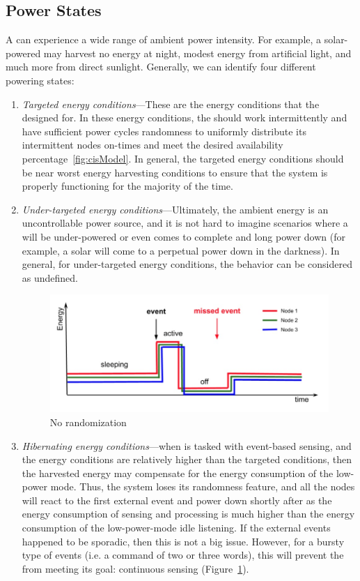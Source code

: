 \subsection{Power States}
A \sys can experience a wide range of ambient power intensity. For example, a solar-powered \sys may harvest no energy at night, modest energy from artificial light, and much more from direct sunlight.  Generally, we can identify four different \sys powering states: 
\begin{enumerate}
		\item \textit{Targeted energy conditions}---These are the energy conditions that the \sys designed for. In these energy conditions, the \sys should work intermittently and have sufficient power cycles randomness to uniformly distribute its intermittent nodes on-times and meet the desired availability percentage~\ref{fig:cisModel}. In general, the targeted energy conditions should be near worst energy harvesting conditions to ensure that the system is properly functioning for the majority of the time.
		\item \textit{Under-targeted energy conditions}---Ultimately, the ambient energy is an uncontrollable power source, and it is not hard to imagine scenarios where a \sys will be under-powered or even comes to complete and long power down (for example, a solar \sys will come to a perpetual power down in the darkness). In general, for under-targeted energy conditions, the \sys behavior can be considered as undefined.
%
\begin{figure}
		\centering
		\includegraphics[width=\columnwidth]{figures/noRandomization}
		\caption{ No randomization}
		\label{fig:noRand}
\end{figure} 
%
		\item \label{it:hibernating} \textit{Hibernating energy conditions}---when \sys is tasked with event-based sensing, and the energy conditions are relatively higher than the targeted conditions, then the harvested energy may compensate for the energy consumption of the low-power mode. Thus, the system loses its randomness feature, and all the nodes will react to the first external event and power down shortly after as the energy consumption of sensing and processing is much higher than the energy consumption of the low-power-mode idle listening. If the external events happened to be sporadic, then this is not a big issue. However, for a bursty type of events (i.e. a command of two or three words), this will prevent the \sys from meeting its goal: continuous sensing (Figure~\ref{fig:noRand}). 

\end{enumerate}
